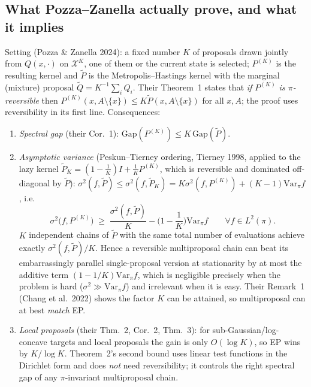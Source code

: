 \documentclass[11pt,a4paper]{article}
\theoremstyle{remark}
\begin{document}
\subsection{What Pozza--Zanella actually prove, and what it implies}\label{sec:pz}
Setting (Pozza \& Zanella 2024): a fixed number $K$ of proposals drawn jointly from $Q(x,\cdot)$ on $\mathcal X^K$, one of them or the current state is selected; $P^{(K)}$ is the resulting kernel and $\tilde P$ is the Metropolis--Hastings kernel with the marginal (mixture) proposal $\tilde Q=K^{-1}\sum_iQ_i$. Their Theorem~1 states that \emph{if $P^{(K)}$ is $\pi$-reversible} then $P^{(K)}(x,A\setminus\{x\})\le K\tilde P(x,A\setminus\{x\})$ for all $x,A$; the proof uses reversibility in its first line. Consequences:
\begin{enumerate}[leftmargin=*]
\item \emph{Spectral gap} (their Cor.~1): $\mathrm{Gap}(P^{(K)})\le K\,\mathrm{Gap}(\tilde P)$.
\item \emph{Asymptotic variance} (Peskun--Tierney ordering, Tierney 1998, applied to the lazy kernel $\tilde P_K=(1-\tfrac1K)I+\tfrac1KP^{(K)}$, which is reversible and dominated off-diagonal by $\tilde P$): $\sigma^2(f,\tilde P)\le\sigma^2(f,\tilde P_K)=K\sigma^2(f,P^{(K)})+(K-1)\mathrm{Var}_\pi f$, i.e.
\[
\sigma^2\big(f,P^{(K)}\big)\;\ge\;\frac{\sigma^2(f,\tilde P)}{K}-\Big(1-\frac1K\Big)\mathrm{Var}_\pi f\qquad\forall f\in L^2(\pi).
\]
$K$ independent chains of $\tilde P$ with the same total number of evaluations achieve exactly $\sigma^2(f,\tilde P)/K$. Hence a reversible multiproposal chain can beat its embarrassingly parallel single-proposal version at stationarity by at most the additive term $(1-1/K)\mathrm{Var}_\pi f$, which is negligible precisely when the problem is hard ($\sigma^2\gg\mathrm{Var}_\pi f$) and irrelevant when it is easy. Their Remark~1 (Chang et al.\ 2022) shows the factor $K$ can be attained, so multiproposal can at best \emph{match} EP.
\item \emph{Local proposals} (their Thm.~2, Cor.~2, Thm.~3): for sub-Gaussian/log-concave targets and local proposals the gain is only $O(\log K)$, so EP wins by $K/\log K$. Theorem~2's second bound uses linear test functions in the Dirichlet form and does \emph{not} need reversibility; it controls the right spectral gap of any $\pi$-invariant multiproposal chain.

\end{enumerate}
\end{document}
